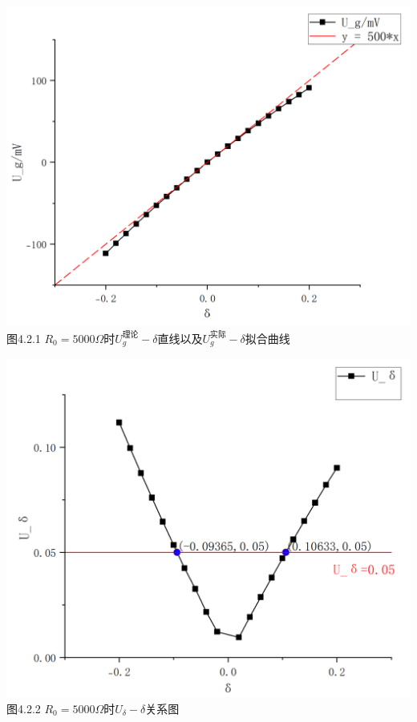 \documentclass{ctexart}
\begin{document}
    ~\\
    \begin{minipage}[c]{0.5\textwidth}
        \centering \includegraphics[scale=0.4]{2.1.1} \\\small{图4.2.1 $R_0=5000\Omega$时$U_g^{\text{理论}} - \delta$直线以及$U_g^{\text{实际}} - \delta$拟合曲线}
    \end{minipage}
    \begin{minipage}[c]{0.5\textwidth}
        \centering \includegraphics[scale=0.4]{2.1.2} \\\small{图4.2.2 $R_0=5000\Omega$时$U_\delta -\delta $关系图}
    \end{minipage}
    ~\\
\end{document}
